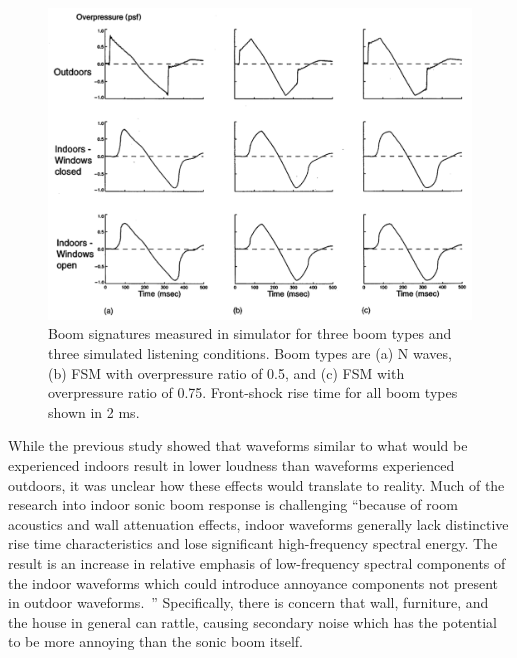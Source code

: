 \documentclass[]{aiaa-tc}%
\begin{document}
\begin{figure}[tb!]
  \centering
  \includegraphics[width=\textwidth]{figs/indoor-outdoor.png}
  \caption{Boom signatures measured in simulator for three boom types and three simulated listening conditions. Boom types are (a) N waves, (b) FSM with overpressure ratio of 0.5, and (c) FSM with overpressure ratio of 0.75. Front-shock rise time for all boom types shown in 2 ms.~\cite{leatherwood2002summary}}
  \label{fig:indoor-outdoor}
\end{figure}

While the previous study showed that waveforms similar to what would be experienced indoors result in lower loudness than waveforms experienced outdoors, it was unclear how these effects would translate to reality. Much of the research into indoor sonic boom response is challenging ``because of room acoustics and wall attenuation effects, indoor waveforms generally lack distinctive rise time characteristics and lose significant high-frequency spectral energy. The result is an increase in relative emphasis of low-frequency spectral components of the indoor waveforms which could introduce annoyance components not present in outdoor waveforms.~\cite{leatherwood2002summary}'' Specifically, there is concern that wall, furniture, and the house in general can rattle, causing secondary noise which has the potential to be more annoying than the sonic boom itself.
\end{document}
